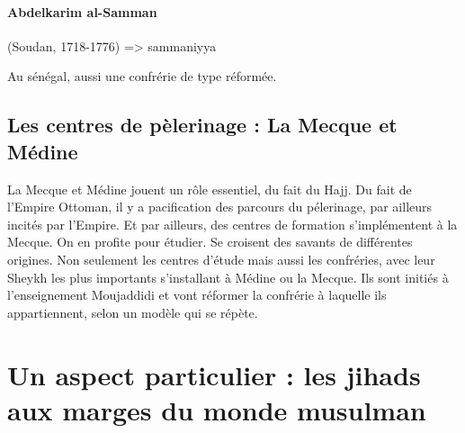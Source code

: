 \paragraph{Abdelkarim al-Samman} (Soudan, 1718-1776) => sammaniyya

Au sénégal, aussi une confrérie de type réformée. 




\subsection{Les centres de pèlerinage : La Mecque et Médine}

La Mecque et Médine jouent un rôle essentiel, du fait du Hajj. Du fait de l'Empire Ottoman, il y a pacification des parcours du pélerinage, par ailleurs incités par l'Empire.
Et par ailleurs, des centres de formation s'implémentent à la Mecque.  On en profite pour étudier. Se croisent des savants de différentes origines.
Non seulement les centres d'étude mais aussi les confréries, avec leur Sheykh les plus importants s'installant à Médine ou la Mecque. Ils sont initiés à l'enseignement Moujaddidi et vont réformer la confrérie à laquelle ils appartiennent, selon un modèle qui se répète.




\section{Un aspect particulier : les jihads aux marges du monde   musulman} 



